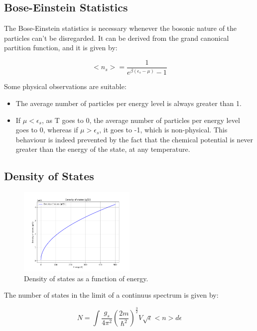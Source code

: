 \documentclass{article}
\begin{document}
\subsection{Bose-Einstein Statistics}

The Bose-Einstein statistics is necessary whenever the bosonic nature of the particles
can't be disregarded.
It can be derived from the grand canonical partition function, and it is given by:

\begin{equation}
    <n_s>=\frac{1}{e^{\beta(\epsilon_s-\mu)}-1}
\end{equation}

Some physical observations are suitable:

\begin{itemize}
    \item The average number of particles per energy level is always greater than 1.
    \item If $\mu<\epsilon_s$, as T goes to 0, the average number of particles per energy level goes to 0,
          whereas if $\mu>\epsilon_s$, it goes to -1, which is non-physical. This behaviour is indeed prevented by
          the fact that the chemical potential is never greater than the energy of the state, at any temperature.
\end{itemize}


\subsection{Density of States}

\begin{figure}[h]
    \centering
    \includegraphics[width=0.5\textwidth]{images/state-density.png}
    \caption{Density of states as a function of energy.}
    \label{fig:density-of-states}
\end{figure}

\begin{tcolorbox}[colframe=gray!50, colback=gray!10, coltitle=black, title=Number of states]
    The number of states in the limit of a continuus spectrum is given by:

    \begin{equation}
        N=\int \frac{g_s}{4\pi^2}\left( \frac{2m}{\hbar^2} \right)^{\frac{3}{2}}V\sqrt{\epsilon} <n>d\epsilon
    \end{equation}
\end{tcolorbox}
\end{document}
